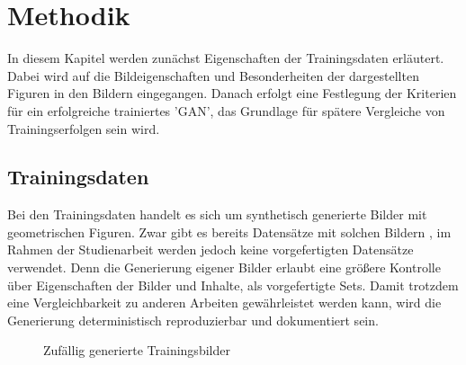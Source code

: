 
\chapter{Methodik}
In diesem Kapitel werden zunächst Eigenschaften der Trainingsdaten erläutert.
Dabei wird auf die Bildeigenschaften und Besonderheiten der dargestellten Figuren in den Bildern eingegangen.
Danach erfolgt eine Festlegung der Kriterien für ein erfolgreiche trainiertes 'GAN', das Grundlage für spätere Vergleiche von Trainingserfolgen sein wird.

\section{Trainingsdaten}
Bei den Trainingsdaten handelt es sich um synthetisch generierte Bilder mit geometrischen Figuren.
Zwar gibt es bereits Datensätze mit solchen Bildern \cite{dataset:four-shapes, dataset:2d-geometric-shapes-dataset}, im Rahmen der Studienarbeit werden jedoch keine vorgefertigten Datensätze verwendet.
Denn die Generierung eigener Bilder erlaubt eine größere Kontrolle über Eigenschaften der Bilder und Inhalte, als vorgefertigte Sets.
Damit trotzdem eine Vergleichbarkeit zu anderen Arbeiten gewährleistet werden kann, wird die Generierung deterministisch reproduzierbar und dokumentiert sein.

\newcommand{\trainDataImage}[1]{\subfloat{\fbox{\texttt{[image: \#1]}}}}
\begin{figure}
	\trainDataImage{kapitel/3\_methodik/data/circle\_00.png}\hfill
	\trainDataImage{kapitel/3\_methodik/data/circle\_01.png}\hfill
	\trainDataImage{kapitel/3\_methodik/data/circle\_02.png}\par \hfill
	
	\trainDataImage{kapitel/3\_methodik/data/rectangle\_00.png}\hfill
	\trainDataImage{kapitel/3\_methodik/data/rectangle\_01.png}\hfill
	\trainDataImage{kapitel/3\_methodik/data/rectangle\_02.png}\par \hfill
	
	\trainDataImage{kapitel/3\_methodik/data/triangle\_00.png}\hfill
	\trainDataImage{kapitel/3\_methodik/data/triangle\_01.png}\hfill
	\trainDataImage{kapitel/3\_methodik/data/triangle\_02.png}\par \hfill
	
	\caption{Zufällig generierte Trainingsbilder}
\end{figure}

